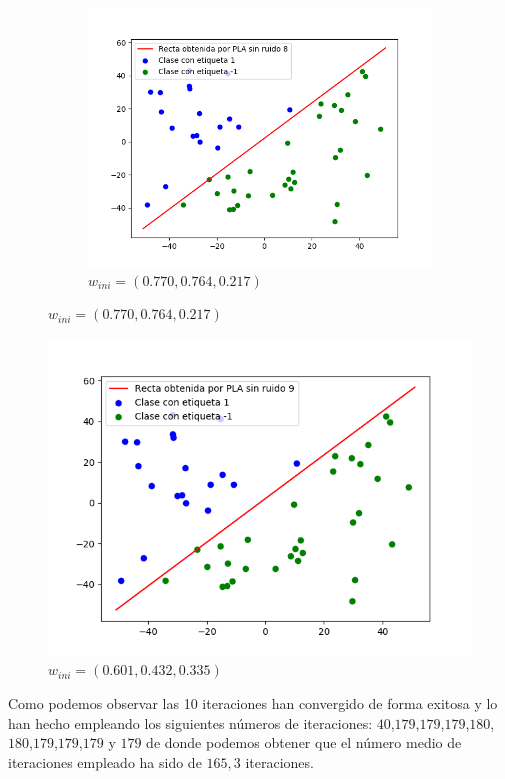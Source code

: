 \documentclass[12pt,a4paper]{article}
\begin{document}
\begin{figure}[H]
\begin{subfigure}{0.33\textwidth}
		\includegraphics[scale=0.37]{./Imagenes/ej2-10.png}
		\caption{$w_{ini} = (0.770,0.764,0.217)$}
	\end{subfigure}
\end{figure}

\begin{figure}[H]
	\centering
	\includegraphics[scale=0.37]{./Imagenes/ej2-11.png}
	\caption{$w_{ini} = (0.601,0.432,0.335)$}
\end{figure}

Como podemos observar las 10 iteraciones han convergido de forma exitosa y lo han hecho empleando los siguientes números de iteraciones: $40$,$179$,$179$,$179$,$180$,$180$,$179$,$179$,$179$ y $179$ de donde podemos obtener que el número medio de iteraciones empleado ha sido de $165,3$ iteraciones.
\end{document}
